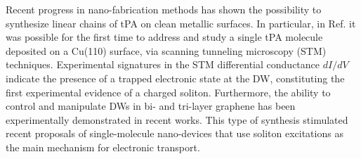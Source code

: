 \documentclass[10pt,a4paper]{article}
\begin{document}
Recent progress in nano-fabrication methods has shown the possibility to synthesize linear chains of tPA on clean metallic surfaces\cite{Wang19_Solitons_in_individual_PA_molecules}. In particular, in Ref.\cite{Wang19_Solitons_in_individual_PA_molecules} it was possible for the first time to address and study a single tPA molecule deposited on a Cu(110) surface, via scanning tunneling microscopy (STM) techniques. Experimental signatures in the STM differential conductance $dI/dV$ indicate the presence of a trapped electronic state at the DW, constituting the first experimental evidence of a charged soliton. Furthermore, the ability to control and manipulate DWs in bi- and tri-layer graphene has been experimentally demonstrated in recent works\cite{Jiang18_Manipulation_of_DWs_in_bi_and_trilayer_graphene}. This type of synthesis stimulated recent proposals of single-molecule nano-devices that use soliton excitations as the main mechanism for electronic transport\cite{HernangomezPerez20_Solitonics_with_PA, park2022creation}.
\end{document}

